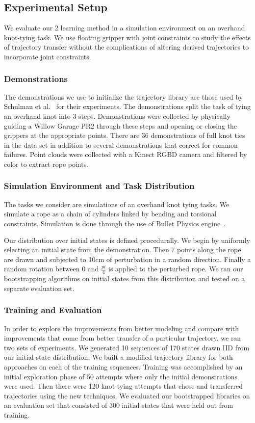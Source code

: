 \subsection{Experimental Setup}
We evaluate our 2 learning method in a simulation environment on an overhand knot-tying task.
We use floating gripper with joint constraints to study the effects of trajectory transfer
without the complications of altering derived trajectories to incorporate joint constraints.

\subsubsection{Demonstrations}
The demonstrations we use to initialize the trajectory library are those used by
Schulman et al.~\cite{Schulmanetal_ISRR2013} for their experiments. The demonstrations
split the task of tying an overhand knot into 3 steps. Demonstrations were collected
by physically guiding a Willow Garage PR2 through these steps and opening or closing 
the grippers at the appropriate points. There are 36 demonstrations of full knot ties
in the data set in addition to several demonstrations that correct for common failures.
Point clouds were collected with a Kinect RGBD camera and filtered by color to extract
rope points. 

\subsubsection{Simulation Environment and Task Distribution} 
The tasks we consider are simulations of an overhand knot tying tasks. 
We simulate a rope as a chain of cylinders linked by bending and torsional constraints.
Simulation is done through the use of Bullet Physics engine~\cite{Bullet_Physics}.

Our distribution over initial states is defined procedurally. We begin by uniformly
selecting an initial state from the demonstration. Then 7 points along the rope are 
drawn and subjected to 10cm of perturbation in a random direction. Finally a random
rotation between 0 and $\frac{pi}{4}$ is applied to the perturbed rope. We ran our
bootstrapping algorithms on initial states from this distribution and tested on a 
separate evaluation set.

\subsubsection{Training and Evaluation}
In order to explore the improvements from better modeling and compare with improvements
that come from better transfer of a particular trajectory, we ran two sets of experiments.
We generated 10 sequences of 170 states drawn IID from our initial state distribution.
We built a modified trajectory library for both approaches on each of the training sequences.
Training was accomplished by an initial exploration phase of 50 attempts where only the initial
demonstrations were used. Then there were 120 knot-tying attempts that chose and transferred
trajectories using the new techniques. We evaluated our bootstrapped libraries on an evaluation
set that consisted of 300 initial states that were held out from training.
